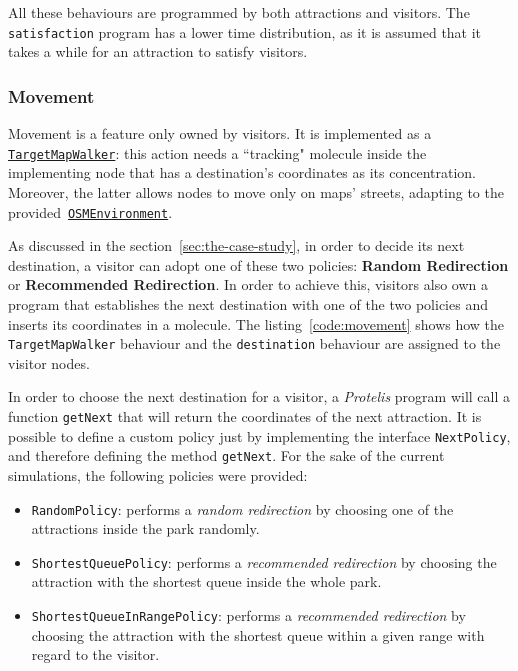 \noindent
All these behaviours are programmed by both attractions and visitors.
The \texttt{satisfaction} program has a lower time distribution, as it is assumed that it takes a while for an attraction to satisfy visitors.

\subsubsection{Movement}\label{subsubsec:movement}
Movement is a feature only owned by visitors.
It is implemented as a \href{https://alchemistsimulator.github.io/reference/kdoc/alchemist/it.unibo.alchemist.model.implementations.actions/-target-map-walker/index.html}{\texttt{TargetMapWalker}}: this action needs a ``tracking" molecule inside the implementing node that has a destination's coordinates as its concentration.
Moreover, the latter allows nodes to move only on maps' streets, adapting to the provided~\href{https://alchemistsimulator.github.io/reference/kdoc/alchemist/it.unibo.alchemist.model.implementations.environments/-o-s-m-environment/}{\texttt{OSMEnvironment}}.

As discussed in the section~\ref{sec:the-case-study}, in order to decide its next destination, a visitor can adopt one of these two policies: \textbf{Random Redirection} or \textbf{Recommended Redirection}.
In order to achieve this, visitors also own a program that establishes the next destination with one of the two policies and inserts its coordinates in a molecule.
The listing~\ref{code:movement} shows how the \texttt{TargetMapWalker} behaviour and the \texttt{destination} behaviour are assigned to the visitor nodes.



In order to choose the next destination for a visitor, a \textit{Protelis} program will call a function \texttt{getNext} that will return the coordinates of the next attraction.
It is possible to define a custom policy just by implementing the interface \texttt{NextPolicy}, and therefore defining the method \texttt{getNext}.
For the sake of the current simulations, the following policies were provided:
\begin{itemize}
    \item \texttt{RandomPolicy}: performs a \textit{random redirection} by choosing one of the attractions inside the park randomly.
    \item \texttt{ShortestQueuePolicy}: performs a \textit{recommended redirection} by choosing the attraction with the shortest queue inside the whole park.
    \item \texttt{ShortestQueueInRangePolicy}: performs a \textit{recommended redirection} by choosing the attraction with the shortest queue within a given range with regard to the visitor.
\end{itemize}

